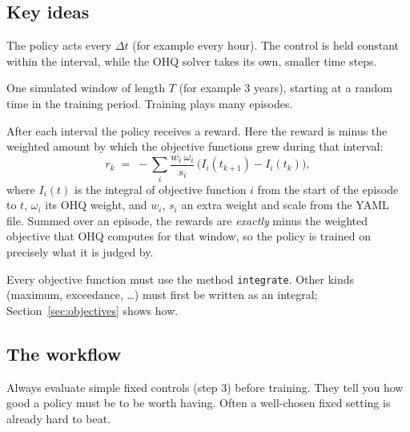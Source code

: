 \documentclass[11pt]{article}
\newcommand{\code}[1]{\texttt{#1}}
\begin{document}
\subsection{Key ideas}
\begin{description}[style=nextline]
\item[Control interval $\Delta t$.] The policy acts every $\Delta t$ (for
  example every hour). The control is held constant within the interval,
  while the OHQ solver takes its own, smaller time steps.
\item[Episode.] One simulated window of length $T$ (for example 3 years),
  starting at a random time in the training period. Training plays many
  episodes.
\item[Reward.] After each interval the policy receives a reward. Here the
  reward is minus the weighted amount by which the objective functions grew
  during that interval:
  \[
  r_k \;=\; -\sum_i \frac{w_i\,\omega_i}{s_i}\,\big(I_i(t_{k+1})-I_i(t_k)\big),
  \]
  where $I_i(t)$ is the integral of objective function $i$ from the start of
  the episode to $t$, $\omega_i$ its OHQ weight, and $w_i$, $s_i$ an extra
  weight and scale from the YAML file. Summed over an episode, the rewards
  are \emph{exactly} minus the weighted objective that OHQ computes for that
  window, so the policy is trained on precisely what it is judged by.
\item[Additive objectives only.] Every objective function must use the
  method \code{integrate}. Other kinds (maximum, exceedance, \ldots) must
  first be written as an integral; Section~\ref{sec:objectives} shows how.
\end{description}

\subsection{The workflow}
\begin{center}
\end{center}
Always evaluate simple fixed controls (step 3) before training. They
tell you how good a policy must be to be worth having. Often a
well-chosen fixed setting is already hard to beat.
\end{document}
